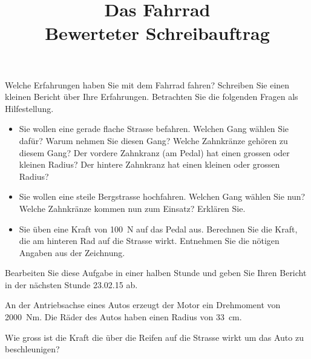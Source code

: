 \documentclass[12pt,a5paper,twoside]{article}
\title{Das Fahrrad\\Bewerteter Schreibauftrag}
\date{}
\begin{document}
\maketitle


\begin{aufgabe}
	Welche Erfahrungen haben Sie mit dem Fahrrad fahren? Schreiben Sie einen kleinen Bericht über Ihre Erfahrungen.
	Betrachten Sie die folgenden Fragen als Hilfestellung.
	\begin{itemize}
		\item	Sie wollen eine gerade flache Strasse befahren. Welchen Gang wählen Sie dafür? Warum nehmen Sie diesen Gang?
		Welche Zahnkränze gehören zu diesem Gang? Der vordere Zahnkranz (am Pedal) hat einen grossen oder kleinen Radius?
		Der hintere Zahnkranz hat einen kleinen oder grossen Radius?

		\item Sie wollen eine steile Bergstrasse hochfahren. Welchen Gang wählen Sie nun? Welche Zahnkränze kommen nun zum Einsatz?
			Erklären Sie.

		\item Sie üben eine Kraft von \SI{100}{N} auf das Pedal aus.
			Berechnen Sie die Kraft, die am hinteren Rad auf die Strasse wirkt. Entnehmen Sie die nötigen Angaben aus der Zeichnung.
	
	\end{itemize}


	\begin{center}
	\end{center}

\end{aufgabe}

Bearbeiten Sie diese Aufgabe in einer halben Stunde und geben Sie Ihren Bericht in der nächsten Stunde 23.02.15 ab.

\newpage

\begin{aufgabe}
	An der Antriebsachse eines Autos erzeugt der Motor ein Drehmoment von \SI{2000}{Nm}.
	Die Räder des Autos haben einen Radius von \SI{33}{cm}.

	Wie gross ist die Kraft die über die Reifen auf die Strasse wirkt um das Auto zu beschleunigen?

\end{aufgabe}
\end{document}
